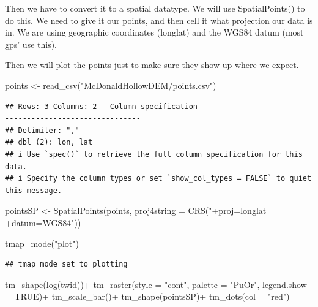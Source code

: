 \documentclass[
]{book}
\newenvironment{Shaded}{\begin{snugshade}}{\end{snugshade}}
\newcommand{\AttributeTok}[1]{\textcolor[rgb]{0.77,0.63,0.00}{#1}}
\newcommand{\ConstantTok}[1]{\textcolor[rgb]{0.00,0.00,0.00}{#1}}
\newcommand{\FunctionTok}[1]{\textcolor[rgb]{0.00,0.00,0.00}{#1}}
\newcommand{\NormalTok}[1]{#1}
\newcommand{\OtherTok}[1]{\textcolor[rgb]{0.56,0.35,0.01}{#1}}
\newcommand{\SpecialCharTok}[1]{\textcolor[rgb]{0.00,0.00,0.00}{#1}}
\newcommand{\StringTok}[1]{\textcolor[rgb]{0.31,0.60,0.02}{#1}}
\begin{document}
Then we have to convert it to a spatial datatype. We will use SpatialPoints() to do this. We need to give it our points, and then cell it what projection our data is in. We are using geographic coordinates (longlat) and the WGS84 datum (most gps' use this).

Then we will plot the points just to make sure they show up where we expect.

\begin{Shaded}
\begin{Highlighting}[]
\NormalTok{points }\OtherTok{\textless{}{-}} \FunctionTok{read\_csv}\NormalTok{(}\StringTok{"McDonaldHollowDEM/points.csv"}\NormalTok{)}
\end{Highlighting}
\end{Shaded}

\begin{verbatim}
## Rows: 3 Columns: 2-- Column specification --------------------------------------------------------
## Delimiter: ","
## dbl (2): lon, lat
## i Use `spec()` to retrieve the full column specification for this data.
## i Specify the column types or set `show_col_types = FALSE` to quiet this message.
\end{verbatim}

\begin{Shaded}
\begin{Highlighting}[]
\NormalTok{pointsSP }\OtherTok{\textless{}{-}} \FunctionTok{SpatialPoints}\NormalTok{(points, }\AttributeTok{proj4string =} \FunctionTok{CRS}\NormalTok{(}\StringTok{"+proj=longlat +datum=WGS84"}\NormalTok{))}

\FunctionTok{tmap\_mode}\NormalTok{(}\StringTok{"plot"}\NormalTok{)}
\end{Highlighting}
\end{Shaded}

\begin{verbatim}
## tmap mode set to plotting
\end{verbatim}

\begin{Shaded}
\begin{Highlighting}[]
\FunctionTok{tm\_shape}\NormalTok{(}\FunctionTok{log}\NormalTok{(twid))}\SpecialCharTok{+}
  \FunctionTok{tm\_raster}\NormalTok{(}\AttributeTok{style =} \StringTok{"cont"}\NormalTok{, }\AttributeTok{palette =} \StringTok{"PuOr"}\NormalTok{, }\AttributeTok{legend.show =} \ConstantTok{TRUE}\NormalTok{)}\SpecialCharTok{+}
  \FunctionTok{tm\_scale\_bar}\NormalTok{()}\SpecialCharTok{+}
\FunctionTok{tm\_shape}\NormalTok{(pointsSP)}\SpecialCharTok{+}
  \FunctionTok{tm\_dots}\NormalTok{(}\AttributeTok{col =} \StringTok{"red"}\NormalTok{)}
\end{Highlighting}
\end{Shaded}
\end{document}
